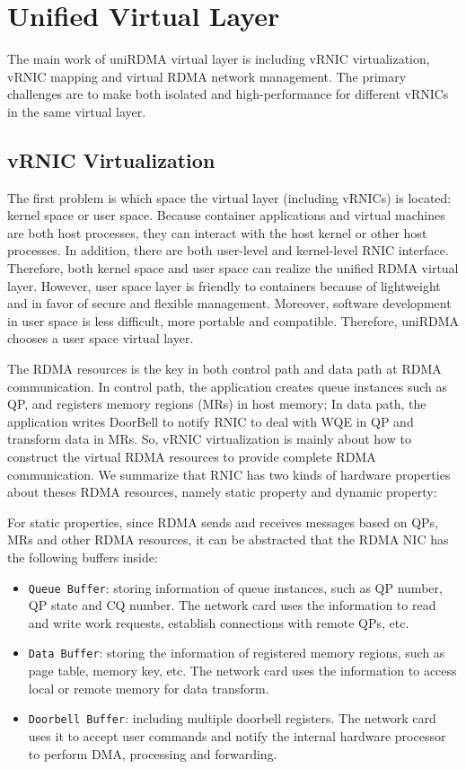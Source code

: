 \section{Unified Virtual Layer}
The main work of uniRDMA virtual layer is including vRNIC virtualization, vRNIC mapping and virtual RDMA network management. The primary challenges are to make both isolated and high-performance for different vRNICs in the same virtual layer. 

\subsection{vRNIC Virtualization}
The first problem is which space the virtual layer (including vRNICs) is located: kernel space or user space. Because container applications and virtual machines are both host processes, they can interact with the host kernel or other host processes. In addition, there are both user-level and kernel-level RNIC interface. Therefore, both kernel space and user space can realize the unified RDMA virtual layer. However, user space layer is friendly to containers because of lightweight and in favor of secure and flexible management. Moreover, software development in user space is less difficult, more portable and compatible. Therefore, uniRDMA chooses a user space virtual layer.

The RDMA resources is the key in both control path and data path at RDMA communication. In control path, the application creates queue instances such as QP, and registers memory regions (MRs) in host memory; In data path, the application writes DoorBell to notify RNIC to deal with WQE in QP and transform data in MRs. So, vRNIC virtualization is mainly about how to construct the virtual RDMA resources to provide complete RDMA communication. We summarize that RNIC has two kinds of hardware properties about theses RDMA resources, namely static property and dynamic property:

For static properties, since RDMA sends and receives messages based on QPs, MRs and other RDMA resources, it can be abstracted that the RDMA NIC has the following buffers inside:

\begin{itemize}
	\item {\verb|Queue Buffer|}: storing information of queue instances, such as QP number, QP state and CQ number. The network card uses the information to read and write work requests, establish connections with remote QPs, etc.  
	\item {\verb|Data Buffer|}: storing the information of registered memory regions, such as page table, memory key, etc. The network card uses the information to access local or remote memory for data transform.  
	\item {\verb|Doorbell Buffer|}: including multiple doorbell registers. The network card uses it to accept user commands and notify the internal hardware processor to perform DMA, processing and forwarding. 
\end{itemize}


